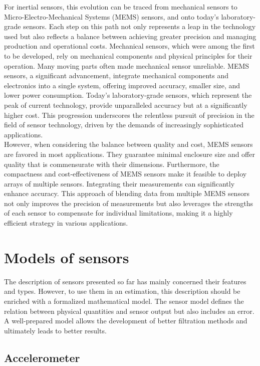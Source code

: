 For inertial sensors, this evolution can be traced from mechanical sensors to Micro-Electro-Mechanical Systems (MEMS) sensors, and onto today’s laboratory-grade sensors. Each step on this path not only represents a leap in the technology used but also reflects a balance between achieving greater precision and managing production and operational costs. Mechanical sensors, which were among the first to be developed, rely on mechanical components and physical principles for their operation. Many moving parts often made mechanical sensor unreliable. MEMS sensors, a significant advancement, integrate mechanical components and electronics into a single system, offering improved accuracy, smaller size, and lower power consumption. Today's laboratory-grade sensors, which represent the peak of current technology, provide unparalleled accuracy but at a significantly higher cost. This progression underscores the relentless pursuit of precision in the field of sensor technology, driven by the demands of increasingly sophisticated applications.\\

However, when considering the balance between quality and cost, MEMS sensors are favored in most applications. They guarantee minimal enclosure size and offer quality that is commensurate with their dimensions. Furthermore, the compactness and cost-effectiveness of MEMS sensors make it feasible to deploy arrays of multiple sensors. Integrating their measurements can significantly enhance accuracy. This approach of blending data from multiple MEMS sensors not only improves the precision of measurements but also leverages the strengths of each sensor to compensate for individual limitations, making it a highly efficient strategy in various applications.

\section{Models of sensors}

The description of sensors presented so far has mainly concerned their features and types. However, to use them in an estimation, this description should be enriched with a formalized mathematical model. The sensor model defines the relation between physical quantities and sensor output but also includes an error. A well-prepared model allows the development of better filtration methods and ultimately leads to better results.

\subsection{Accelerometer}

